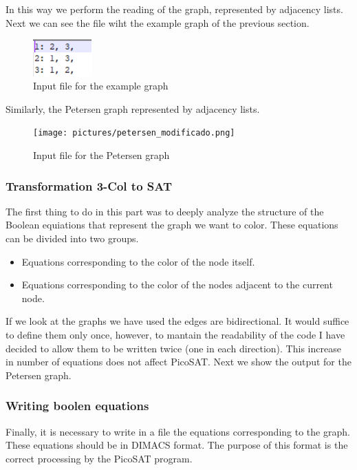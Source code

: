 \documentclass{article}
\begin{document}
        In this way we perform the reading of the graph, represented by adjacency lists. Next we can 
        see the file wiht the example graph of the previous section.
        \begin{figure}[H]
            \centering
            \includegraphics[width=0.2\textwidth]{pictures/entrada_ejemplo.png}
            \caption{Input file for the example graph}
        \end{figure}

        Similarly, the Petersen graph represented by adjacency lists. 
        \begin{figure}[H]
            \centering
            \texttt{[image: pictures/petersen\_modificado.png]}
            \caption{Input file for the Petersen graph}
        \end{figure}
    
    \subsubsection{Transformation 3-Col to SAT}
    The first thing to do in this part was to deeply analyze the structure of the 
    Boolean equiations that represent the graph we want to color. These equations can be divided into two groups.
        \begin{itemize}
            \item Equations corresponding to the color of the node itself.
            \item Equations corresponding to the color of the nodes adjacent to the current node.
        \end{itemize}
        If we look at the graphs we have used the edges are bidirectional. It would suffice to define them only once, 
        however, to mantain the readability of the code I have decided to allow them to be written twice (one in each direction). 
        This increase in number of equations does not affect PicoSAT. Next we show the output for the Petersen graph.
    
    \subsubsection{Writing boolen equations}
        Finally, it is necessary to write in a file the equations corresponding to the graph. These equations should be in DIMACS format. 
        The purpose of this format is the correct processing by the PicoSAT program.
\end{document}
